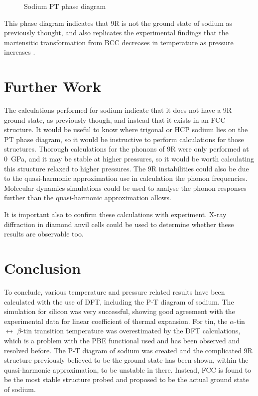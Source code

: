 \documentclass[12pt]{article}
\begin{document}
\begin{figure}
	\centering
	
	\caption{Sodium PT phase diagram}
	\label{fig:na_phase_diagram}
\end{figure}

This phase diagram indicates that 9R is not the ground state of sodium as previously thought, and also replicates the experimental findings that the martensitic transformation from BCC decreases in temperature as pressure increases \cite{smith1991pressure}.
\section{Further Work}
The calculations performed for sodium indicate that it does not have a 9R ground state, as previously though, and instead that it exists in an FCC structure. 
It would be useful to know where trigonal or HCP sodium lies on the PT phase diagram, so it would be instructive to perform calculations for those structures.
Thorough calculations for the phonons of 9R were only performed at \SI{0}{\giga\pascal}, and it may be stable at higher pressures, so it would be worth calculating this structure relaxed to higher pressures.
The 9R instabilities could also be due to the quasi-harmonic approximation use in calculation the phonon frequencies. Molecular dynamics simulations could be used to analyse the phonon responses further than the quasi-harmonic approximation allows.

It is important also to confirm these calculations with experiment. X-ray diffraction in diamond anvil cells could be used to determine whether these results are observable too.

\section{Conclusion}
To conclude, various temperature and pressure related results have been calculated with the use of DFT, including the P-T diagram of sodium. The simulation for silicon was very successful, showing good agreement with the experimental data for linear coefficient of thermal expansion. For tin, the $\alpha$-tin $\leftrightarrow$ $\beta$-tin transition temperature was overestimated by the DFT calculations, which is a problem with the PBE functional used and has been observed and resolved before.
The P-T diagram of sodium was created and the complicated 9R structure previously believed to be the ground state has been shown, within the quasi-harmonic approximation, to be unstable in there. 
Instead, FCC is found to be the most stable structure probed and proposed to be the actual ground state of sodium.
\end{document}
